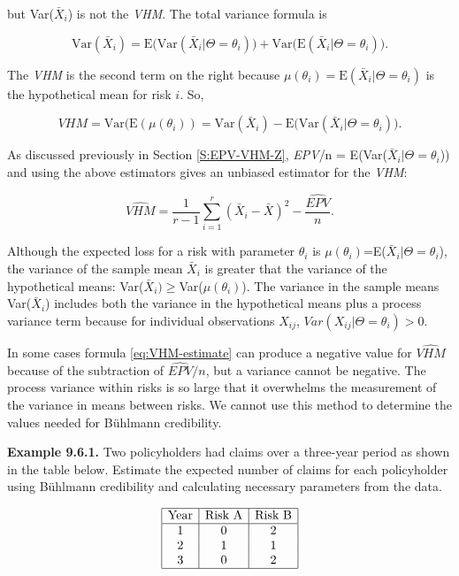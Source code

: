 \documentclass[]{book}
\theoremstyle{definition}
\theoremstyle{definition}
\theoremstyle{definition}
\theoremstyle{remark}
\begin{document}
but Var(\(\bar{X}_i\)) is not the \emph{VHM}. The total variance formula
is

\begin{equation*} 
\mathrm{Var}(\bar{X}_i)=\textrm{E(Var}(\bar{X}_i|\Theta=\theta_i))+\textrm{Var(E}(\bar{X}_i|\Theta=\theta_i)).
\end{equation*}

The \emph{VHM} is the second term on the right because
\(\mu(\theta_i)=\mathrm{E}(\bar{X}_i|\Theta=\theta_i)\) is the
hypothetical mean for risk \(i\). So,

\begin{equation*} 
VHM=\textrm{Var(E}(\mu(\theta_i)) = \mathrm{Var}(\bar{X}_i) - \textrm{E(Var}(\bar{X}_i|\Theta=\theta_i)).
\end{equation*}

As discussed previously in Section \ref{S:EPV-VHM-Z}, \emph{EPV}/n =
E(Var(\(\bar{X}_i|\Theta=\theta_i\))) and using the above estimators
gives an unbiased estimator for the \emph{VHM}:

\begin{equation} 
\widehat{VHM} = \frac{1}{r-1} \sum_{i=1}^{r}(\bar{X}_i-\bar{X})^2 - \frac{\widehat{EPV}}{n} .
\label{eq:VHM-estimate}
\end{equation}

Although the expected loss for a risk with parameter \(\theta_i\) is
\(\mu(\theta_i)\)=E(\(\bar{X}_i|\Theta=\theta_i\)), the variance of the
sample mean \(\bar{X}_i\) is greater that the variance of the
hypothetical means: Var(\(\bar{X}_i)\geq\)Var(\(\mu(\theta_i)\)). The
variance in the sample means Var(\(\bar{X}_i\)) includes both the
variance in the hypothetical means plus a process variance term because
for individual observations \(X_{ij}\),
\(Var(X_{ij}|\Theta=\theta_i)>0\).

In some cases formula \eqref{eq:VHM-estimate} can produce a negative value
for \(\widehat{VHM}\) because of the subtraction of \(\widehat{EPV}/n\),
but a variance cannot be negative. The process variance within risks is
so large that it overwhelms the measurement of the variance in means
between risks. We cannot use this method to determine the values needed
for Bühlmann credibility.

\textbf{Example 9.6.1.} Two policyholders had claims over a three-year
period as shown in the table below. Estimate the expected number of
claims for each policyholder using Bühlmann credibility and calculating
necessary parameters from the data.

\[\begin{matrix}
\begin{array}{|c|c|c|}
\hline
\text{Year} & \text{Risk A} & \text{Risk B} \\
\hline
1 & 0 &  2 \\
2 & 1 &  1  \\  
3 & 0 &  2  \\              
\hline
\end{array}
\end{matrix}\]
\end{document}
